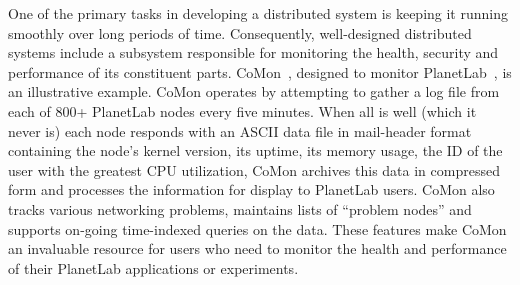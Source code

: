 



One of the primary tasks in developing
a distributed system is keeping it  running smoothly over
long periods of time.  
Consequently, well-designed distributed systems include
a subsystem responsible for monitoring the health, security and
performance of its constituent parts.
CoMon~\cite{comon}, designed to monitor PlanetLab~\cite{planetlab},
is an illustrative example.  CoMon
%
% 
operates by
attempting to gather a log file from each of 800+ PlanetLab nodes every
five minutes.
When all is well (which it never is) each node responds with
an ASCII data file in mail-header format containing 
the node's kernel version, its uptime, its memory usage, the
ID of the user with the greatest CPU utilization, \etc{}  CoMon archives
this data in compressed form and processes the information
for display to PlanetLab users.  CoMon also tracks various
networking problems, maintains lists 
of ``problem nodes'' and  supports on-going time-indexed 
queries on the data.  These features make CoMon an invaluable resource
for users who need to monitor the health and performance of their
PlanetLab applications or experiments.

